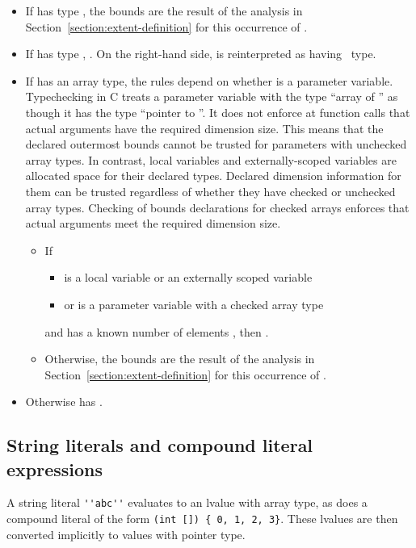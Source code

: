 \begin{itemize}
\item
  If  has type \arrayptr, the bounds are the result of
  the analysis in Section~\ref{section:extent-definition}
  for this occurrence of .
\item
  If  has type \ptrT, 
  .
   On the right-hand side,  is reinterpreted as having \arrayptr\ type.
\item
  If  has an array type, the rules depend on whether   is a parameter
  variable.  Typechecking in C treats a parameter variable with the type ``array of ''
   as though it has the type ``pointer to ''.   It does not enforce 
  at function calls that actual arguments have the required dimension size.  This means
  that the declared outermost bounds cannot be trusted for parameters with unchecked
  array types.  In contrast, local variables and externally-scoped variables are allocated 
  space for their declared types.  Declared dimension information for them can be trusted 
  regardless of whether they have checked or unchecked array types.  Checking of bounds 
  declarations for checked arrays  enforces that actual arguments meet the required
  dimension size.
\begin{itemize}
\item If 
\begin{itemize} 
\item {} is a local variable or an externally scoped variable 
\item or  is a parameter variable with a checked array type
\end{itemize}
and  has a known number of elements , then  
  .
\item Otherwise, the bounds are the result of the analysis in 
  Section~\ref{section:extent-definition} for this occurrence of .
\end{itemize}
\item  Otherwise  has \boundsunknown.
\end{itemize}

\subsection{String literals and compound literal expressions}
A string literal \lstinline+''abc''+ evaluates to an lvalue with array type,
as does a compound literal of the form \lstinline+(int []) { 0, 1, 2, 3}+.
These lvalues are then converted implicitly to values with pointer type.

